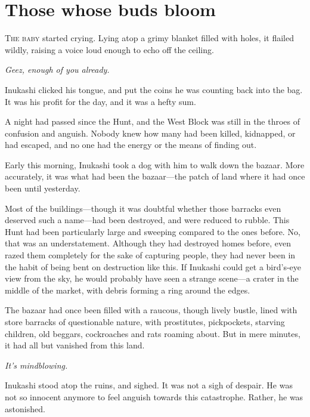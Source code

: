 
\chapter{Those whose buds bloom}


\lettrine{T}{he baby} started crying. Lying atop a grimy blanket filled with holes,
it flailed wildly, raising a voice loud enough to echo off the ceiling.

\emph{Geez, enough of you already.}

Inukashi clicked his tongue, and put the coins he was counting back into
the bag. It was his profit for the day, and it was a hefty sum.

A night had passed since the Hunt, and the West Block was still in the
throes of confusion and anguish. Nobody knew how many had been killed,
kidnapped, or had escaped, and no one had the energy or the means of
finding out.

Early this morning, Inukashi took a dog with him to walk down the
bazaar. More accurately, it was what had been the bazaar---the patch of
land where it had once been until yesterday.

Most of the buildings---though it was doubtful whether those barracks even
deserved such a name---had been destroyed, and were reduced to rubble.
This Hunt had been particularly large and sweeping compared to the ones
before. No, that was an understatement. Although they had destroyed
homes before, even razed them completely for the sake of capturing
people, they had never been in the habit of being bent on destruction
like this. If Inukashi could get a bird's-eye view from the sky, he
would probably have seen a strange scene---a crater in the middle of the
market, with debris forming a ring around the edges.

The bazaar had once been filled with a raucous, though lively bustle,
lined with store barracks of questionable nature, with prostitutes,
pickpockets, starving children, old beggars, cockroaches and rats
roaming about. But in mere minutes, it had all but vanished from this
land.

\emph{It's mindblowing.}

Inukashi stood atop the ruins, and sighed. It was not a sigh of despair.
He was not so innocent anymore to feel anguish towards this catastrophe.
Rather, he was astonished.

